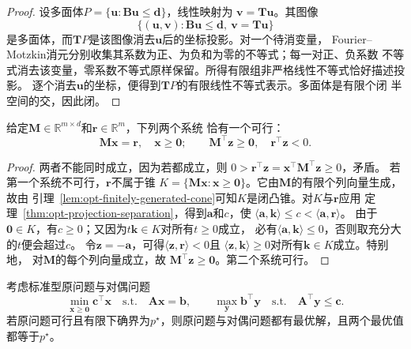 \begin{proof}
设多面体$P=\{\bm{u}:\bm{B}\bm{u}\leq\bm{d}\}$，线性映射为
$\bm{v}=\bm{T}\bm{u}$。其图像
\[
  \{(\bm{u},\bm{v}):\bm{B}\bm{u}\leq\bm{d},\
  \bm{v}=\bm{T}\bm{u}\}
\]
是多面体，而$\bm{T}P$是该图像消去$\bm{u}$后的坐标投影。对一个待消变量，
Fourier--Motzkin消元分别收集其系数为正、为负和为零的不等式；每一对正、负系数
不等式消去该变量，零系数不等式原样保留。所得有限组非严格线性不等式恰好描述投影。
逐个消去$\bm{u}$的坐标，便得到$\bm{T}P$的有限线性不等式表示。多面体是有限个闭
半空间的交，因此闭。
\end{proof}

\begin{theorem}[Farkas择一定理]
\label{thm:opt-farkas}
给定$\bm{M}\in\mathbb{R}^{m\times d}$和$\bm{r}\in\mathbb{R}^m$，下列两个系统
恰有一个可行：
\[
  \bm{M}\bm{x}=\bm{r},\quad\bm{x}\geq\bm{0};
  \qquad
  \bm{M}^{\top}\bm{z}\geq\bm{0},\quad
  \bm{r}^{\top}\bm{z}<0.
\]
\end{theorem}

\begin{proof}
两者不能同时成立，因为若都成立，则
$0>\bm{r}^{\top}\bm{z}
=\bm{x}^{\top}\bm{M}^{\top}\bm{z}\geq0$，矛盾。
若第一个系统不可行，$\bm{r}$不属于锥
$K=\{\bm{M}\bm{x}:\bm{x}\geq\bm{0}\}$。它由$\bm{M}$的有限个列向量生成，故由
引理~\ref{lem:opt-finitely-generated-cone}可知$K$是闭凸锥。对$K$与$\bm{r}$应用
定理~\ref{thm:opt-projection-separation}，得到$\bm{a}$和$c$，使
$\langle\bm{a},\bm{k}\rangle\leq c<\langle\bm{a},\bm{r}\rangle$。
由于$\bm{0}\in K$，有$c\geq0$；又因为$t\bm{k}\in K$对所有$t\geq0$成立，
必有$\langle\bm{a},\bm{k}\rangle\leq0$，否则取充分大的$t$便会超过$c$。
令$\bm{z}=-\bm{a}$，可得$\langle\bm{z},\bm{r}\rangle<0$且
$\langle\bm{z},\bm{k}\rangle\geq0$对所有$\bm{k}\in K$成立。特别地，
对$\bm{M}$的每个列向量成立，故
$\bm{M}^{\top}\bm{z}\geq\bm{0}$。第二个系统可行。
\end{proof}

\begin{theorem}[有限维线性规划强对偶]
\label{thm:opt-lp-strong-duality}
考虑标准型原问题与对偶问题
\[
  \min_{\bm{x}\geq\bm{0}}\bm{c}^{\top}\bm{x}
  \quad\text{s.t.}\quad\bm{A}\bm{x}=\bm{b},
  \qquad
  \max_{\bm{y}}\bm{b}^{\top}\bm{y}
  \quad\text{s.t.}\quad\bm{A}^{\top}\bm{y}\leq\bm{c}.
\]
若原问题可行且有限下确界为$p^\star$，则原问题与对偶问题都有最优解，且两个最优值
都等于$p^\star$。
\end{theorem}

